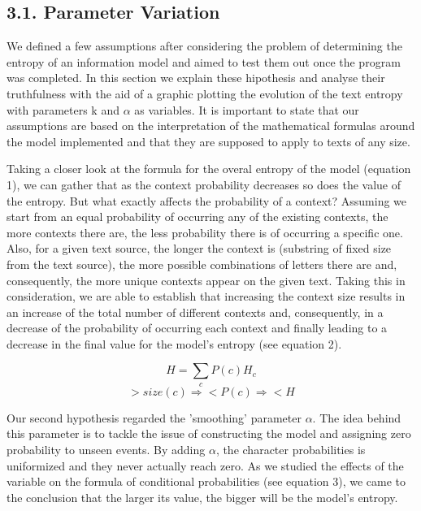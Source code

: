 \documentclass[12pt]{article}
\begin{document}
\subsection*{3.1. Parameter Variation}

We defined a few assumptions after considering the problem of determining
the entropy of an information model and aimed to test them out once the 
program was completed.
In this section we explain these hipothesis and analyse their truthfulness
with the aid of a graphic plotting the evolution of the text entropy with
parameters k and $\alpha$ as variables.
It is important to state that our assumptions are based on the interpretation
of the mathematical formulas around the model implemented and that they 
are supposed to apply to texts of any size.

Taking a closer look at the formula for the overal entropy of the model 
(equation 1), we can gather that as the context probability 
decreases so does the value of the entropy.
But what exactly affects the probability of a context? 
Assuming we start from an equal probability of occurring any of the existing
contexts, the more contexts there are, the less probability there is of 
occurring a specific one.
Also, for a given text source, the longer the context is (substring of fixed 
size from the text source), the more possible combinations of letters there 
are and, consequently, the more unique contexts appear on the given text.
Taking this in consideration, we are able to establish that increasing the 
context size results in an increase of the total number of different contexts
and, consequently, in a decrease of the probability of occurring each context
and finally leading to a decrease in the final value for the model's entropy
(see equation 2).

\begin{equation}
  H = \sum\limits_{c} P(c) H_{c}
\end{equation}
\begin{equation}
  >size(c) \Rightarrow <P(c) \Rightarrow <H
\end{equation}

Our second hypothesis regarded the 'smoothing' parameter $\alpha$.
The idea behind this parameter is to tackle the issue of constructing the
model and assigning zero probability to unseen events.
By adding $\alpha$, the character probabilities is uniformized and they 
never actually reach zero.
As we studied the effects of the variable on the formula of conditional 
probabilities (see equation 3), we came to the conclusion that the larger
its value, the bigger will be the model's entropy.
\end{document}
